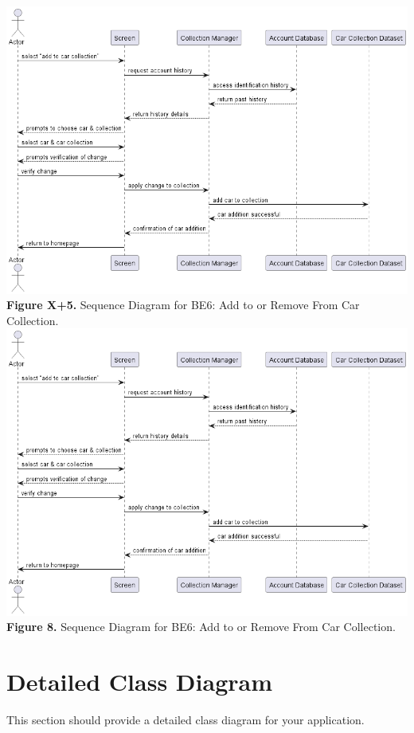 \documentclass[]{article}
\begin{document}
\begin{center}
	\includegraphics[scale=0.55]{Sequence Diagrams/BE6_Sequence_Diagram.png}\\
	\textbf{Figure X+5.} Sequence Diagram for BE6: Add to or Remove From Car Collection.\\
	\includegraphics[scale=0.55]{Sequence Diagrams/BE6_Sequence_Diagram.png}\\
	\textbf{Figure 8.} Sequence Diagram for BE6: Add to or Remove From Car Collection.\\
\end{center}

\section{Detailed Class Diagram}
\label{sec:detailed_class_diagram}
This section should provide a detailed class diagram for your application.
\end{document}
